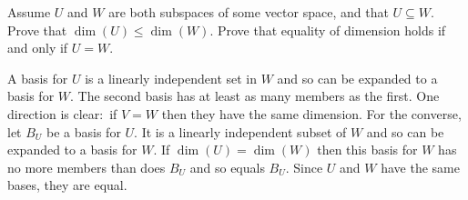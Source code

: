 
\begin{Exercise}[
name={},
title={}, 
difficulty=0,
origin={\cite{JH}}]
    Assume \( U \) and \( W \) are both subspaces of some vector space, and
    that \( U\subseteq W \).
    \Question Prove that \( \dim (U)\leq\dim (W) \).
    \Question Prove that equality of dimension holds
        if and only if \( U=W \).
\end{Exercise}

\begin{Answer}
    \Question A basis for \( U \) is a linearly independent set
            in \( W \)
            and so can be expanded to a basis for \( W \).
            The second basis has at least as many members as the first.
    \Question One direction is clear:~if \( V=W \) then they have the 
            same dimension.
            For the converse, let \( B_U \) be a basis for \( U \).
            It is a linearly independent subset of \( W \) and so can be
            expanded to a basis for \( W \).
            If \( \dim(U)=\dim(W) \) then this basis for \( W \) has no more
            members than does \( B_U \) and so equals \( B_U \).
            Since \( U \) and \( W \) have the same bases, they are equal.
\end{Answer}
